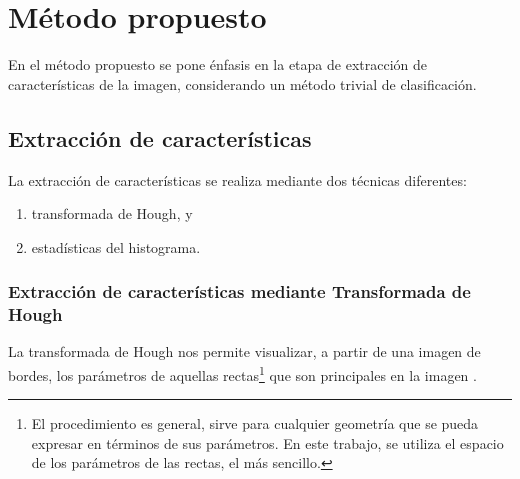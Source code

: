\documentclass[conference,a4paper,10pt,oneside,final]{tfmpd}
\begin{document}
\section{Método propuesto}
En el método propuesto se pone énfasis en la etapa de
extracción de carac\-te\-rís\-ti\-cas de la imagen, considerando
un método trivial de clasificación.
%
%
\subsection*{Extracción de características}
La extracción de ca\-rac\-te\-rís\-ti\-cas se realiza
mediante dos técnicas diferentes:
\begin{enumerate}
  \item transformada de Hough, y
  \item estadísticas del histograma.
\end{enumerate}

%
%
\subsubsection{Extracción de características mediante Transformada de Hough}
La transformada de Hough nos permite visualizar, a partir de una imagen de
bordes, los parámetros de aquellas rectas\footnote{El procedimiento es general,
sirve para cualquier geometría que se pueda expresar en términos de sus
parámetros. En este trabajo, se utiliza el espacio
de los parámetros de las rectas, el más sencillo.}
que son principales en la imagen \cite{gonzalez+woods}.
\end{document}

